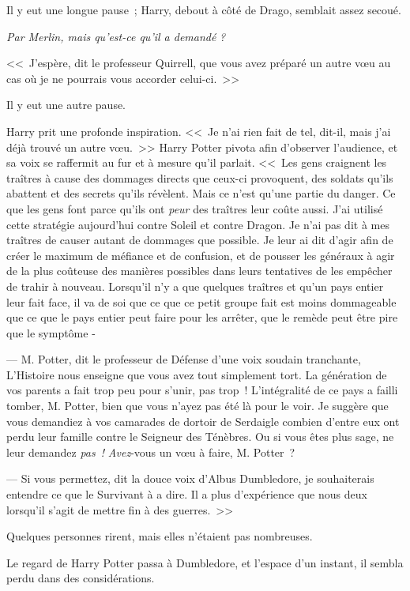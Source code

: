 Il y eut une longue pause~; Harry, debout à côté de Drago, semblait assez secoué.

\emph{Par Merlin, mais qu'est-ce qu'il a demandé} \emph{?}

<<~J'espère, dit le professeur Quirrell, que vous avez préparé un autre vœu au cas où je ne pourrais vous accorder celui-ci.~>>

Il y eut une autre pause.

Harry prit une profonde inspiration. <<~Je n'ai rien fait de tel, dit-il, mais j'ai déjà trouvé un autre vœu.~>> Harry Potter pivota afin d'observer l'audience, et sa voix se raffermit au fur et à mesure qu'il parlait. <<~Les gens craignent les traîtres à cause des dommages directs que ceux-ci provoquent, des soldats qu'ils abattent et des secrets qu'ils révèlent. Mais ce n'est qu'une partie du danger. Ce que les gens font parce qu'ils ont \emph{peur} des traîtres leur coûte aussi. J'ai utilisé cette stratégie aujourd'hui contre Soleil et contre Dragon. Je n'ai pas dit à mes traîtres de causer autant de dommages que possible. Je leur ai dit d'agir afin de créer le maximum de méfiance et de confusion, et de pousser les généraux à agir de la plus coûteuse des manières possibles dans leurs tentatives de les empêcher de trahir à nouveau. Lorsqu'il n'y a que quelques traîtres et qu'un pays entier leur fait face, il va de soi que ce que ce petit groupe fait est moins dommageable que ce que le pays entier peut faire pour les arrêter, que le remède peut être pire que le symptôme -

--- M. Potter, dit le professeur de Défense d'une voix soudain tranchante, L'Histoire nous enseigne que vous avez tout simplement tort. La génération de vos parents a fait trop peu pour s'unir, pas trop~! L'intégralité de ce pays a failli tomber, M. Potter, bien que vous n'ayez pas été là pour le voir. Je suggère que vous demandiez à vos camarades de dortoir de Serdaigle combien d'entre eux ont perdu leur famille contre le Seigneur des Ténèbres. Ou si vous êtes plus sage, ne leur demandez \emph{pas~!} \emph{Avez}-vous un vœu à faire, M. Potter~?

--- Si vous permettez, dit la douce voix d'Albus Dumbledore, je souhaiterais entendre ce que le Survivant à a dire. Il a plus d'expérience que nous deux lorsqu'il s'agit de mettre fin à des guerres.~>>

Quelques personnes rirent, mais elles n'étaient pas nombreuses.

Le regard de Harry Potter passa à Dumbledore, et l'espace d'un instant, il sembla perdu dans des considérations.

